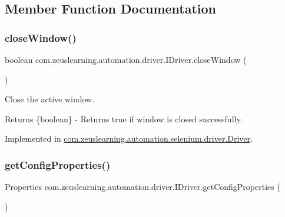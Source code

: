 \subsection{Member Function Documentation}
\hypertarget{interfacecom_1_1zeuslearning_1_1automation_1_1driver_1_1IDriver_a1efada042eeea9713b798f713bfad650}{}\label{interfacecom_1_1zeuslearning_1_1automation_1_1driver_1_1IDriver_a1efada042eeea9713b798f713bfad650} 
\subsubsection{\texorpdfstring{close\+Window()}{closeWindow()}}
{\footnotesize\ttfamily boolean com.\+zeuslearning.\+automation.\+driver.\+I\+Driver.\+close\+Window (\begin{DoxyParamCaption}{ }\end{DoxyParamCaption})}

Close the active window.

\begin{DoxyReturn}{Returns}
\{boolean\} -\/ Returns {\ttfamily true} if window is closed successfully. 
\end{DoxyReturn}


Implemented in \hyperlink{classcom_1_1zeuslearning_1_1automation_1_1selenium_1_1driver_1_1Driver_ac81edc32c4c0c5173723161f93b5d9a0}{com.\+zeuslearning.\+automation.\+selenium.\+driver.\+Driver}.

\hypertarget{interfacecom_1_1zeuslearning_1_1automation_1_1driver_1_1IDriver_a2530732df342f07743bed12deb55fee8}{}\label{interfacecom_1_1zeuslearning_1_1automation_1_1driver_1_1IDriver_a2530732df342f07743bed12deb55fee8} 
\subsubsection{\texorpdfstring{get\+Config\+Properties()}{getConfigProperties()}}
{\footnotesize\ttfamily Properties com.\+zeuslearning.\+automation.\+driver.\+I\+Driver.\+get\+Config\+Properties (\begin{DoxyParamCaption}{ }\end{DoxyParamCaption})}

